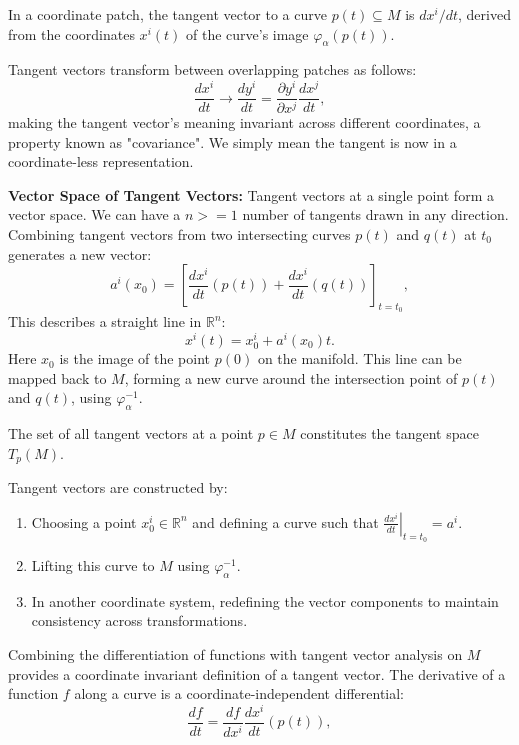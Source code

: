 \documentclass{article}
\begin{document}
\begin{theorem}
In a coordinate patch, the tangent vector to a curve $p(t) \subseteq M$ is $dx^i/dt$, derived from the coordinates $x^i(t)$ of the curve's image $\varphi_\alpha(p(t))$.
\end{theorem}

Tangent vectors transform between overlapping patches as follows:
\[
\frac{dx^i}{dt} \rightarrow \frac{dy^i}{dt} = \frac{\partial y^i}{\partial x^j} \frac{dx^j}{dt},
\]
making the tangent vector's meaning invariant across different coordinates, a property known as "covariance". We simply mean the tangent is now in a coordinate-less representation. 

\textbf{Vector Space of Tangent Vectors:} Tangent vectors at a single point form a vector space. We can have a \( n>=1 \) number of tangents drawn in any direction. Combining tangent vectors from two intersecting curves $p(t)$ and $q(t)$ at $t_0$ generates a new vector:
\[
a^i(x_0) = \left[ \frac{dx^i}{dt} (p(t)) + \frac{dx^i}{dt} (q(t)) \right]_{t=t_0},
\]
This describes a straight line in $\mathbb{R}^n$:
\[
x^i(t) = x_0^i + a^i(x_0)t.
\]
Here \( x_0 \) is the image of the point \( p(0) \) on the manifold. This line can be mapped back to $M$, forming a new curve around the intersection point of $p(t)$ and $q(t)$, using $\varphi_\alpha^{-1}$.

\begin{theorem}
The set of all tangent vectors at a point $p \in M$ constitutes the tangent space $T_p(M)$.

Tangent vectors are constructed by:
\begin{enumerate}
    \item Choosing a point $x_0^i \in \mathbb{R}^n$ and defining a curve such that $\left. \frac{dx^i}{dt} \right|_{t=t_0} = a^i$.
    \item Lifting this curve to $M$ using $\varphi_\alpha^{-1}$.
    \item In another coordinate system, redefining the vector components to maintain consistency across transformations.
\end{enumerate}    
\end{theorem}

Combining the differentiation of functions with tangent vector analysis on $M$ provides a coordinate invariant definition of a tangent vector. The derivative of a function $f$ along a curve is a coordinate-independent differential:
\[
\frac{df}{dt} = \frac{df}{dx^i} \frac{dx^i}{dt} (p(t)),
\]
\end{document}
